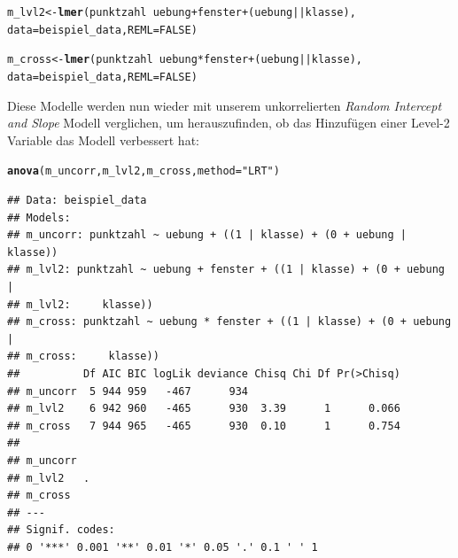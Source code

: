 \documentclass[12pt]{article}\usepackage[]{graphicx}\usepackage[]{color}
\makeatletter
\newcommand{\hlnum}[1]{\textcolor[rgb]{0.686,0.059,0.569}{#1}}%
\newcommand{\hlstr}[1]{\textcolor[rgb]{0.192,0.494,0.8}{#1}}%
\newcommand{\hlopt}[1]{\textcolor[rgb]{0,0,0}{#1}}%
\newcommand{\hlstd}[1]{\textcolor[rgb]{0.345,0.345,0.345}{#1}}%
\newcommand{\hlkwb}[1]{\textcolor[rgb]{0.69,0.353,0.396}{#1}}%
\newcommand{\hlkwc}[1]{\textcolor[rgb]{0.333,0.667,0.333}{#1}}%
\newcommand{\hlkwd}[1]{\textcolor[rgb]{0.737,0.353,0.396}{\textbf{#1}}}%
\newenvironment{kframe}{%
 \def\at@end@of@kframe{}%
 \ifinner\ifhmode%
  \def\at@end@of@kframe{\end{minipage}}%
  \begin{minipage}{\columnwidth}%
 \fi\fi%
 \def\FrameCommand##1{\hskip\@totalleftmargin \hskip-\fboxsep
 \colorbox{shadecolor}{##1}\hskip-\fboxsep
     \hskip-\linewidth \hskip-\@totalleftmargin \hskip\columnwidth}%
 \MakeFramed {\advance\hsize-\width
   \@totalleftmargin\z@ \linewidth\hsize
   \@setminipage}}%
 {\par\unskip\endMakeFramed%
 \at@end@of@kframe}
\newenvironment{knitrout}{}{} %
\makeatother
\begin{document}
\singlespacing
\begin{knitrout}
\color{fgcolor}\begin{kframe}
\begin{alltt}
\hlstd{m_lvl2} \hlkwb{<-} \hlkwd{lmer}\hlstd{(punktzahl} \hlopt{~} \hlstd{uebung} \hlopt{+} \hlstd{fenster} \hlopt{+} \hlstd{(uebung} \hlopt{||} \hlstd{klasse),}
        \hlkwc{data} \hlstd{= beispiel_data,} \hlkwc{REML} \hlstd{=} \hlnum{FALSE}\hlstd{)}

\hlstd{m_cross} \hlkwb{<-} \hlkwd{lmer}\hlstd{(punktzahl} \hlopt{~} \hlstd{uebung} \hlopt{*} \hlstd{fenster} \hlopt{+} \hlstd{(uebung} \hlopt{||} \hlstd{klasse),}
        \hlkwc{data} \hlstd{= beispiel_data,} \hlkwc{REML} \hlstd{=} \hlnum{FALSE}\hlstd{)}
\end{alltt}
\end{kframe}
\end{knitrout}

Diese Modelle werden nun wieder mit unserem unkorrelierten \textit{Random Intercept and Slope} Modell verglichen, um herauszufinden, ob das Hinzufügen einer Level-2 Variable das Modell verbessert hat:

\singlespacing
\begin{knitrout}
\color{fgcolor}\begin{kframe}
\begin{alltt}
\hlkwd{anova}\hlstd{(m_uncorr, m_lvl2, m_cross,} \hlkwc{method} \hlstd{=} \hlstr{"LRT"}\hlstd{)}
\end{alltt}
\begin{verbatim}
## Data: beispiel_data
## Models:
## m_uncorr: punktzahl ~ uebung + ((1 | klasse) + (0 + uebung | klasse))
## m_lvl2: punktzahl ~ uebung + fenster + ((1 | klasse) + (0 + uebung | 
## m_lvl2:     klasse))
## m_cross: punktzahl ~ uebung * fenster + ((1 | klasse) + (0 + uebung | 
## m_cross:     klasse))
##          Df AIC BIC logLik deviance Chisq Chi Df Pr(>Chisq)
## m_uncorr  5 944 959   -467      934                        
## m_lvl2    6 942 960   -465      930  3.39      1      0.066
## m_cross   7 944 965   -465      930  0.10      1      0.754
##           
## m_uncorr  
## m_lvl2   .
## m_cross   
## ---
## Signif. codes:  
## 0 '***' 0.001 '**' 0.01 '*' 0.05 '.' 0.1 ' ' 1
\end{verbatim}
\end{kframe}
\end{knitrout}
\end{document}
